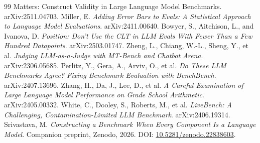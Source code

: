 \documentclass[11pt]{article}
\newcommand{\companionDOI}{10.5281/zenodo.22838603}
\begin{document}
\begin{thebibliography}{99}
{Matters: Construct Validity in Large Language Model Benchmarks}. arXiv:2511.04703.
 Miller, E. \emph{Adding Error Bars to Evals: A Statistical
Approach to Language Model Evaluations}. arXiv:2411.00640.
 Bowyer, S., Aitchison, L., and Ivanova, D. \emph{Position: Don't
Use the CLT in LLM Evals With Fewer Than a Few Hundred Datapoints}.
arXiv:2503.01747.
 Zheng, L., Chiang, W.-L., Sheng, Y., et al. \emph{Judging
LLM-as-a-Judge with MT-Bench and Chatbot Arena}. arXiv:2306.05685.
 Perlitz, Y., Gera, A., Arviv, O., et al. \emph{Do These LLM
Benchmarks Agree? Fixing Benchmark Evaluation with BenchBench}. arXiv:2407.13696.
 Zhang, H., Da, J., Lee, D., et al. \emph{A Careful Examination of
Large Language Model Performance on Grade School Arithmetic}. arXiv:2405.00332.
 White, C., Dooley, S., Roberts, M., et al. \emph{LiveBench: A
Challenging, Contamination-Limited LLM Benchmark}. arXiv:2406.19314.
 Srivastava, M. \emph{Constructing a Benchmark When Every
Component Is a Language Model}. Companion preprint, Zenodo, 2026.
DOI: \href{https://doi.org/\companionDOI}{\companionDOI}.
\end{thebibliography}
\end{document}

